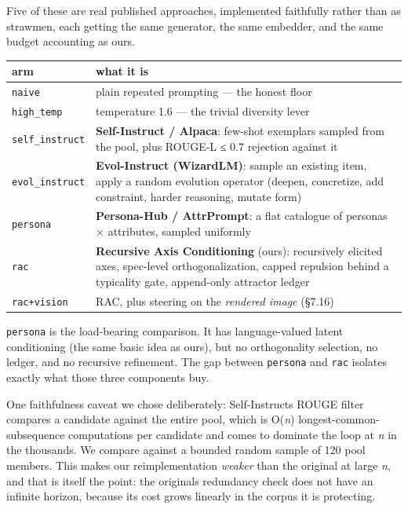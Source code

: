 \documentclass[
  10pt,
]{article}
\theoremstyle{plain}
\theoremstyle{definition}
\begin{document}
Five of these are real published approaches, implemented faithfully
rather than as strawmen, each getting the same generator, the same
embedder, and the same budget accounting as ours.

{\footnotesize
\begin{longtable}[]{@{}>{\raggedright\arraybackslash}p{}>{\raggedright\arraybackslash}p{}@{}}
\toprule\noalign{}
arm & what it is \\
\midrule\noalign{}
\endhead
\bottomrule\noalign{}
\endlastfoot
\texttt{naive} & plain repeated prompting --- the honest floor \\
\texttt{high\_temp} & temperature 1.6 --- the trivial diversity lever \\
\texttt{self\_instruct} & \textbf{Self-Instruct / Alpaca}: few-shot
exemplars sampled from the pool, plus ROUGE-L ≤ 0.7 rejection against
it \\
\texttt{evol\_instruct} & \textbf{Evol-Instruct (WizardLM)}: sample an
existing item, apply a random evolution operator (deepen, concretize,
add constraint, harder reasoning, mutate form) \\
\texttt{persona} & \textbf{Persona-Hub / AttrPrompt}: a flat catalogue
of personas × attributes, sampled uniformly \\
\texttt{rac} & \textbf{Recursive Axis Conditioning} (ours): recursively
elicited axes, spec-level orthogonalization, capped repulsion behind a
typicality gate, append-only attractor ledger \\
\texttt{rac+vision} & RAC, plus steering on the \emph{rendered image}
(§7.16) \\
\end{longtable}}

\texttt{persona} is the load-bearing comparison. It has language-valued
latent conditioning (the same basic idea as ours), but no orthogonality
selection, no ledger, and no recursive refinement. The gap between
\texttt{persona} and \texttt{rac} isolates exactly what those three
components buy.

One faithfulness caveat we chose deliberately:
Self-Instruct\textquotesingle s ROUGE filter compares a candidate
against the entire pool, which is O(\emph{n}) longest-common-subsequence
computations per candidate and comes to dominate the loop at \emph{n} in
the thousands. We compare against a bounded random sample of 120 pool
members. This makes our reimplementation \emph{weaker} than the original
at large \emph{n}, and that is itself the point: the
original\textquotesingle s redundancy check does not have an infinite
horizon, because its cost grows linearly in the corpus it is protecting.
\end{document}
